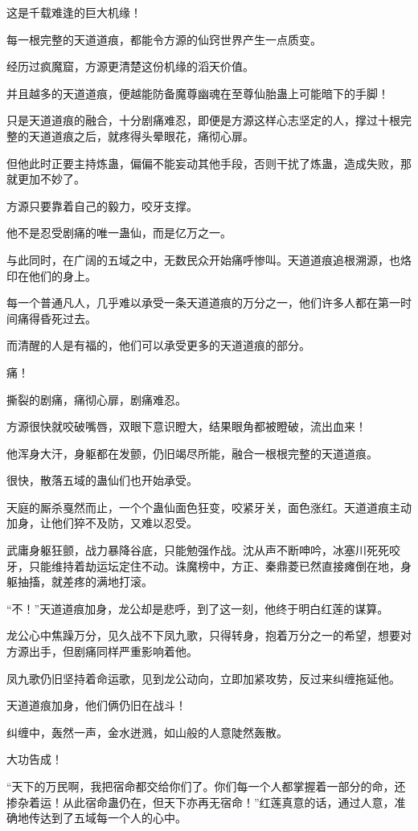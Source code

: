 \begin{this_body}
这是千载难逢的巨大机缘！

每一根完整的天道道痕，都能令方源的仙窍世界产生一点质变。

经历过疯魔窟，方源更清楚这份机缘的滔天价值。

并且越多的天道道痕，便越能防备魔尊幽魂在至尊仙胎蛊上可能暗下的手脚！

只是天道道痕的融合，十分剧痛难忍，即便是方源这样心志坚定的人，撑过十根完整的天道道痕之后，就疼得头晕眼花，痛彻心扉。

但他此时正要主持炼蛊，偏偏不能妄动其他手段，否则干扰了炼蛊，造成失败，那就更加不妙了。

方源只要靠着自己的毅力，咬牙支撑。

他不是忍受剧痛的唯一蛊仙，而是亿万之一。

与此同时，在广阔的五域之中，无数民众开始痛呼惨叫。天道道痕追根溯源，也烙印在他们的身上。

每一个普通凡人，几乎难以承受一条天道道痕的万分之一，他们许多人都在第一时间痛得昏死过去。

而清醒的人是有福的，他们可以承受更多的天道道痕的部分。

痛！

撕裂的剧痛，痛彻心扉，剧痛难忍。

方源很快就咬破嘴唇，双眼下意识瞪大，结果眼角都被瞪破，流出血来！

他浑身大汗，身躯都在发颤，仍旧竭尽所能，融合一根根完整的天道道痕。

很快，散落五域的蛊仙们也开始承受。

天庭的厮杀戛然而止，一个个蛊仙面色狂变，咬紧牙关，面色涨红。天道道痕主动加身，让他们猝不及防，又难以忍受。

武庸身躯狂颤，战力暴降谷底，只能勉强作战。沈从声不断呻吟，冰塞川死死咬牙，只能维持着劫运坛定住不动。诛魔榜中，方正、秦鼎菱已然直接瘫倒在地，身躯抽搐，就差疼的满地打滚。

“不！”天道道痕加身，龙公却是悲呼，到了这一刻，他终于明白红莲的谋算。

龙公心中焦躁万分，见久战不下凤九歌，只得转身，抱着万分之一的希望，想要对方源出手，但剧痛同样严重影响着他。

凤九歌仍旧坚持着命运歌，见到龙公动向，立即加紧攻势，反过来纠缠拖延他。

天道道痕加身，他们俩仍旧在战斗！

纠缠中，轰然一声，金水迸溅，如山般的人意陡然轰散。

大功告成！

“天下的万民啊，我把宿命都交给你们了。你们每一个人都掌握着一部分的命，还掺杂着运！从此宿命蛊仍在，但天下亦再无宿命！”红莲真意的话，通过人意，准确地传达到了五域每一个人的心中。


\end{this_body}
